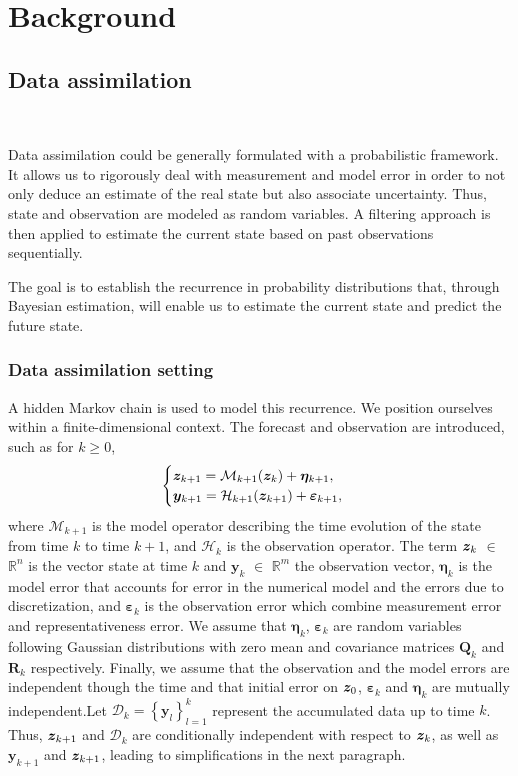 
\section{Background}

\subsection{Data assimilation}~\label{Background_DA}

Data assimilation could be generally formulated with a probabilistic framework. It allows us to rigorously deal with measurement and model error in order to not only deduce an estimate of the real state but also associate uncertainty. Thus, state and observation are modeled as random variables. A filtering approach is then applied to estimate the current state based on past observations sequentially.

The goal is to establish the recurrence in probability distributions that, through Bayesian estimation, will enable us to estimate the current state and predict the future state.


\subsubsection{Data assimilation setting}

A hidden Markov chain is used to model this recurrence. We position ourselves within a finite-dimensional context. The forecast and observation are introduced, such as for $ k \geq 0$,
\[
    \begin{cases}
        \bm{z}_{k+1} = \mathcal{M}_{k+1} (\bm{z}_{k}) + \bm{\eta}_{k+1}, \\
        \bm{y}_{k+1} = \mathcal{H}_{k+1} (\bm{z}_{k+1}) + \bm \varepsilon_{k+1},
    \end{cases}
\]where $\mathcal{M}_{k+1}$ is the model operator describing the time evolution of the state from time $k$ to time $k+1$, and $\mathcal{H}_k$ is the observation operator. The term $\bm{z}_k$ $\in$ $\mathbb{R}^n$ is the vector state at time $k$ and $\bm{y}_k$ $\in$ $\mathbb{R}^m$ the observation vector, $\bm{\eta}_{k}$ is the model error that accounts for error in the numerical model and the errors due to discretization, and $\bm{\varepsilon}_k$ is the observation error which combine measurement error and representativeness error. We assume that $\bm{\eta}_{k}$, $\bm{\varepsilon}_k$ are random variables following Gaussian distributions with zero mean and covariance matrices $\bm Q_k$ and $\bm R_k$ respectively. Finally, we assume that the observation and the model errors are independent though the time and that initial error on $\bm{z}_0$, $\bm{\varepsilon}_k$ and $\bm{\eta}_{k}$ are mutually independent.Let $\mathcal{D}_k = \left\{\bm y_l\right\}_{l=1}^k$ represent the accumulated data up to time $k$.
Thus, $\bm{z}_{k+1}$ and $\mathcal{D}_k$ are conditionally independent with respect to $\bm{z}_{k}$, as well as $\bm{y}_{k+1}$ and $\bm{z}_{k+1}$, leading to simplifications in the next paragraph.

